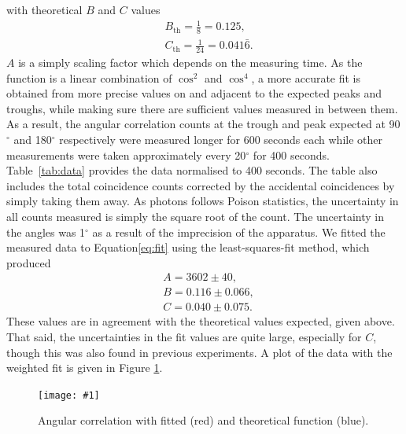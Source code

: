 \documentclass[twocolumn]{article}
\newcommand{\insertFigure}[1]{%
   \texttt{[image: \#1]}%
}
\begin{document}
with theoretical $B$ and $C$ values\cite{sieg}
\begin{align*}
&B_{\text{th}} = \frac{1}{8} = 0.125,\\
&C_{\text{th}} = \frac{1}{24} = 0.041\bar{6}.
\end{align*}
$A$ is a simply scaling factor which depends on the measuring time. As the function is a linear combination of $\cos^2$ and $\cos^4$, a more accurate fit is obtained from more precise values on and adjacent to the expected peaks and troughs, while making sure there are sufficient values measured in between them. As a result, the angular correlation counts at the trough and peak expected at 90$^{\circ}$ and 180$^{\circ}$ respectively were measured longer for 600 seconds each while other measurements were taken approximately every 20$^{\circ}$ for 400 seconds. Table~\ref{tab:data} provides the data normalised to 400 seconds. The table also includes the total coincidence counts corrected by the accidental coincidences by simply taking them away. As photons follows Poison statistics, the uncertainty in all counts measured is simply the square root of the count. The uncertainty in the angles was 1$^\circ$ as a result of the imprecision of the apparatus. We fitted the measured data to Equation\ref{eq:fit} using the least-squares-fit method, which produced
\begin{align*}
&A = 3602 \pm 40,\\
&B = 0.116  \pm 0.066,\\
&C = 0.040 \pm 0.075.
\end{align*}
These values are in agreement with the theoretical values expected, given above. That said, the uncertainties in the fit values are quite large, especially for $C$, though this was also found in previous experiments.\cite{meliss} A plot of the data with the weighted fit is given in Figure \ref{fig:angular}.
\begin{figure}
\centering
\insertFigure{angular.png}
\caption{Angular correlation with fitted (red) and theoretical function (blue).}
\label{fig:angular}
\end{figure}
\end{document}
